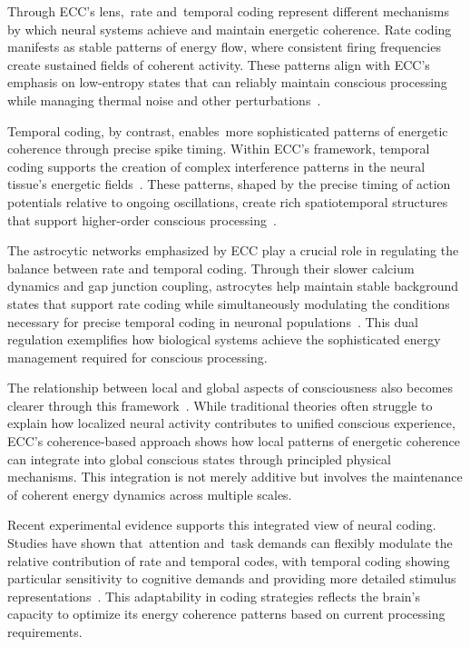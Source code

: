Through ECC's lens,~rate and~temporal coding represent different mechanisms by which neural systems achieve and maintain energetic coherence. Rate coding manifests as stable patterns of energy flow, where consistent firing frequencies create sustained fields of coherent activity. These patterns align with ECC's emphasis on low-entropy states that can reliably maintain conscious processing while managing thermal noise and other perturbations~\cite{attwell2001}.

Temporal coding, by contrast, enables~more sophisticated patterns of energetic coherence through precise spike timing. Within ECC's framework, temporal coding supports the creation of complex interference patterns in the neural tissue's energetic fields~\cite{pinotsis2023vivo}. These patterns, shaped by the precise timing of action potentials relative to ongoing oscillations, create rich spatiotemporal structures that support higher-order conscious processing~\cite{zheng2025unbearable}.

The astrocytic networks emphasized by ECC play a crucial role in regulating the balance between rate and temporal coding. Through their slower calcium dynamics and gap junction coupling, astrocytes help maintain stable background states that support rate coding while simultaneously modulating the conditions necessary for precise temporal coding in neuronal populations~\cite{pellerin2004neuroenergetics}. This dual regulation exemplifies how biological systems achieve the sophisticated energy management required for conscious processing.

The relationship between local and global aspects of consciousness also becomes clearer through this framework~\cite{breakspear2005dynamics}. While traditional theories often struggle to explain how localized neural activity contributes to unified conscious experience, ECC's coherence-based approach shows how local patterns of energetic coherence can integrate into global conscious states through principled physical mechanisms. This integration is not merely additive but involves the maintenance of coherent energy dynamics across multiple scales.

Recent experimental evidence supports this integrated view of neural coding. Studies have shown that~attention and~task demands can flexibly modulate the relative contribution of rate and temporal codes, with temporal coding showing particular sensitivity to cognitive demands and providing more detailed stimulus representations~\cite{zhang2023adaptive}. This adaptability in coding strategies reflects the brain's capacity to optimize its energy coherence patterns based on current processing requirements.

